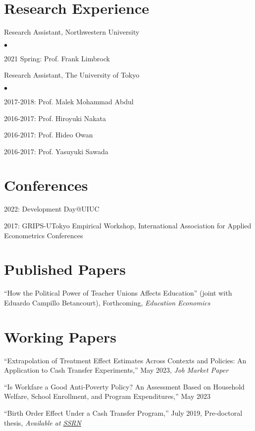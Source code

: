\documentclass[margin,line]{res}
\newenvironment{list1}{
  \begin{list}{\ding{113}}{%
      \setlength{\itemsep}{.025in}
      \setlength{\parsep}{0in} \setlength{\parskip}{0in}
      \setlength{\topsep}{0in} \setlength{\partopsep}{0in}
      \setlength{\leftmargin}{0.17in}}}{\end{list}}
\newenvironment{list2}{
  \begin{list}{$\bullet$}{%
      \setlength{\itemsep}{0in}
      \setlength{\parsep}{0in} \setlength{\parskip}{0in}
      \setlength{\topsep}{0in} \setlength{\partopsep}{0in}
      \setlength{\leftmargin}{0.2in}}}{\end{list}}
\begin{document}
\begin{resume}
\section{Research Experience}
\begin{list1}
\item[] Research Assistant, Northwestern University
	\begin{list2}
		\item[] 2021 Spring: Prof. Frank Limbrock
	\end{list2}
\item[] Research Assistant, The University of Tokyo
	\begin{list2}
	        \item[] 2017-2018: Prof. Malek Mohammad Abdul
		\item[] 2016-2017: Prof. Hiroyuki Nakata
		\item[] 2016-2017: Prof. Hideo Owan
		\item[] 2016-2017: Prof. Yasuyuki Sawada
	\end{list2}
\end{list1}

\section{Conferences}
\begin{list1}
\item[] 2022: Development Day@UIUC
\item[] 2017: GRIPS-UTokyo Empirical Workshop, International Association for Applied Econometrics Conferences
\end{list1}

\pagebreak

\section{Published Papers}
\begin{list1}
\item[] ``How the Political Power of Teacher Unions Affects Education'' (joint with Eduardo Campillo Betancourt), Forthcoming, {\it Education Economics}
\end{list1}


\section{Working Papers}
\begin{list1}
\item[] ``Extrapolation of Treatment Effect Estimates Across Contexts and Policies: An Application to Cash Transfer Experiments,'' May 2023, {\it Job Market Paper}
\item[] ``Is Workfare a Good Anti-Poverty Policy? An Assessment Based on Household Welfare, School Enrollment, and Program Expenditures,'' May 2023
\item[] ``Birth Order Effect Under a Cash Transfer Program,'' July 2019, Pre-doctoral thesis, {\it Available at \href{https://papers.ssrn.com/sol3/papers.cfm?abstract_id=3010113}{SSRN}}
\end{list1}


\end{resume}
\end{document}
